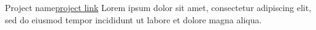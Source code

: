 \documentclass[10pt, a4paper]{article}
\begin{document}

\begin{projitem}{Project name}{\href{https://link}{project link}}
    Lorem ipsum dolor sit amet, consectetur adipiscing elit, sed do eiusmod tempor incididunt ut labore et dolore magna aliqua.
\end{projitem}


\fincols
\end{document}

